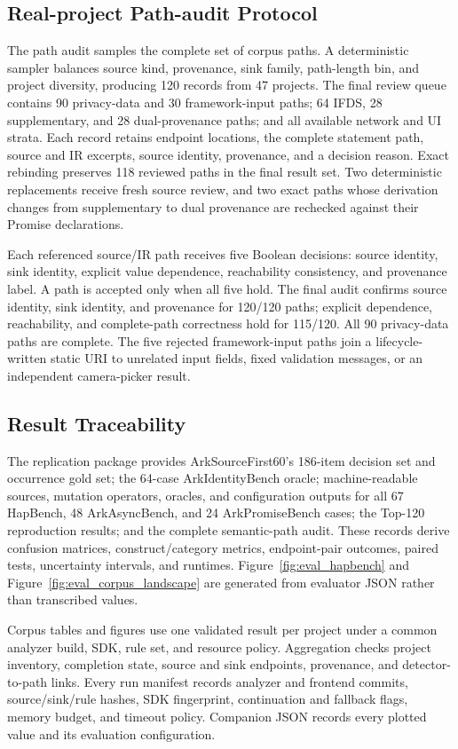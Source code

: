 \subsection{Real-project Path-audit Protocol}
\label{subsec:app_path_audit}

The path audit samples the complete set of \CorpusPaths{} corpus paths. A deterministic sampler balances source kind, provenance, sink family, path-length bin, and project diversity, producing 120 records from 47 projects. The final review queue contains 90 privacy-data and 30 framework-input paths; 64 IFDS, 28 supplementary, and 28 dual-provenance paths; and all available network and UI strata. Each record retains endpoint locations, the complete statement path, source and IR excerpts, source identity, provenance, and a decision reason. Exact rebinding preserves 118 reviewed paths in the final result set. Two deterministic replacements receive fresh source review, and two exact paths whose derivation changes from supplementary to dual provenance are rechecked against their Promise declarations.

Each referenced source/IR path receives five Boolean decisions: source identity, sink identity, explicit value dependence, reachability consistency, and provenance label. A path is accepted only when all five hold. The final audit confirms source identity, sink identity, and provenance for 120/120 paths; explicit dependence, reachability, and complete-path correctness hold for 115/120. All 90 privacy-data paths are complete. The five rejected framework-input paths join a lifecycle-written static URI to unrelated input fields, fixed validation messages, or an independent camera-picker result.

\subsection{Result Traceability}
\label{subsec:app_traceability}

The replication package provides ArkSourceFirst60's 186-item decision set and occurrence gold set; the 64-case ArkIdentityBench oracle; machine-readable sources, mutation operators, oracles, and configuration outputs for all 67 HapBench, 48 ArkAsyncBench, and 24 ArkPromiseBench cases; the Top-120 reproduction results; and the complete semantic-path audit. These records derive confusion matrices, construct/category metrics, endpoint-pair outcomes, paired tests, uncertainty intervals, and runtimes. Figure~\ref{fig:eval_hapbench} and Figure~\ref{fig:eval_corpus_landscape} are generated from evaluator JSON rather than transcribed values.

Corpus tables and figures use one validated result per project under a common analyzer build, SDK, rule set, and resource policy. Aggregation checks project inventory, completion state, source and sink endpoints, provenance, and detector-to-path links. Every run manifest records analyzer and frontend commits, source/sink/rule hashes, SDK fingerprint, continuation and fallback flags, memory budget, and timeout policy. Companion JSON records every plotted value and its evaluation configuration.
